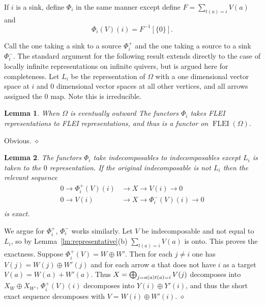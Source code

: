 \documentclass{article}
\newtheorem{lemma}{Lemma}[section]
\newenvironment{proof}{\vspace*{2ex}\noindent {\em Proof:}
}{\hfill $\diamond$ \\[2ex]}
\begin{document}
If $i$ is a sink, define $\Phi_i$ in the same manner except define $F=\sum_{t(a)=i} V(a)$ and 
\[\Phi_i(V)(i)= F^{-1}[\{0\}].\]

Call the one taking a sink to a source $\Phi^+_i$ and the one taking a source to a sink $\Phi_i^-$.  The standard argument for the following result extends directly to the case of locally infinite representations on infinite quivers, but is  argued here for completeness. Let $L_i$ be the representation of $\Omega$ with a one dimensional vector space at $i$ and  $0$ dimensional vector spaces at all other vertices, and all arrows assigned the $0$ map.  Note this is irreducible.


\begin{lemma}\label{reflection-FLEI}
 When $\Omega$ is eventually outward The functors $\Phi_i$ takes FLEI representations to FLEI representations, and thus is a functor on $\operatorname{FLEI}(\Omega)$. 
\end{lemma}

\begin{proof}
  Obvious.
\end{proof}

\begin{lemma} \label{lm:reflection-indec}
  The functors $\Phi_i$ take indecomposables to indecomposables except $L_i$ is taken to the $0$ representation.  If the original indecomposable is not $L_i$ then the relevant sequence
  \begin{align*}
    0 \to \Phi^+_i(V)(i) &\to X \to V(i) \to 0\\
    0 \to V(i) &\to X \to \Phi_i^-(V)(i) \to 0\\
  \end{align*}
  is exact.
\end{lemma}

\begin{proof}
  We argue for $\Phi_i^+$, $\Phi_i^-$ works similarly.  Let $V$ be indecomposable and not equal to $L_i$,  so by Lemma~\ref{lm:representative}(b) $\sum_{t(a)=i}V(a)$ is onto.  This proves the exactness.   Suppose $\Phi_i^+(V)= W \oplus W'$.  Then for each $j \neq i$ one has $V(j) = W(j) \oplus W'(j)$ and for each arrow $a$ that does not have $i$ as a target $V(a)=W(a) + W'(a)$.  Thus $X=\bigoplus_{j=a(a)\\t(a)=i} V(j)$ decomposes into $X_W \oplus X_{W'}$, $\Phi_i^+(V)(i)$ decomposes into $Y(i) \oplus Y'(i)$, and thus the short exact sequence decomposes with $V= W(i) \oplus W'(i)$.
\end{proof}
\end{document}
